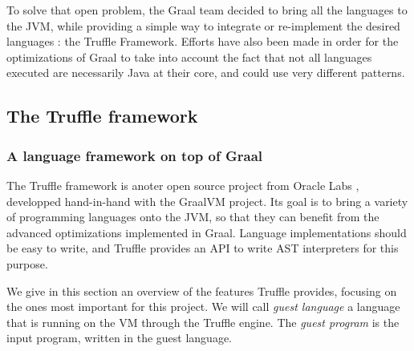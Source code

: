 \documentclass[twoside,11pt,a4paper]{article}
\begin{document}
To solve that open problem, the Graal team decided to bring all the languages to the JVM, while providing a simple way to integrate or re-implement the desired languages : the Truffle Framework. Efforts have also been made in order for the optimizations of Graal to take into account the fact that not all languages executed are necessarily Java at their core, and could use very different patterns.

\subsection{The Truffle framework}

\subsubsection{A language framework on top of Graal}


The Truffle framework is anoter open source project from Oracle Labs \cite{trufflerepo}, developped hand-in-hand with the GraalVM project. Its goal is to bring a variety of programming languages onto the JVM, so that they can benefit from the advanced optimizations implemented in Graal. Language implementations should be easy to write, and Truffle provides an API to write AST interpreters for this purpose.

We give in this section an overview of the features Truffle provides, focusing on the ones most important for this project. We will call \textit{guest language} a language that is running on the VM through the Truffle engine. The \textit{guest program} is the input program, written in the guest language.

\end{document}
